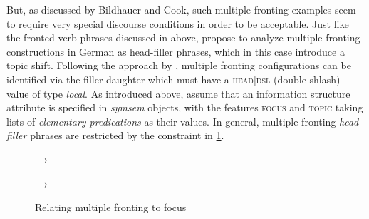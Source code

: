 \documentclass[output=paper]{langsci/langscibook}
\begin{document}
But, as discussed by Bildhauer and Cook, such multiple fronting
examples seem to require very special discourse conditions in order to
be acceptable. Just like the fronted verb phrases discussed in
\cite{dKM2003a} above, \cite{BC2010a} propose
to analyze multiple fronting constructions in German as head-filler
phrases, which in this case introduce a topic shift. Following the
approach by \cite{Mueller2005d-unlinked}, multiple fronting
configurations can be identified via the filler daughter which must
have a \textsc{head|dsl} (double shlash) value of type
\textit{local}. As introduced above, \cite{BC2010a} assume that an
information structure attribute is specified in \textit{symsem}
objects, with the features \textsc{focus} and \textsc{topic} taking
lists of \textit{elementary predications} as their values. In general,
multiple fronting \textit{head-filler} phrases are restricted by the
constraint in \ref{fig:multiplefronting}.
\begin{figure}[htp]
  \centering
    \begin{avm}
    \end{avm}
$\to$\ 
  \begin{avm}
  \end{avm}

\bigskip
    \begin{avm}
    \end{avm}
$\to$\ 
  \begin{avm}
  \end{avm}
  \caption{Relating multiple fronting to focus}
  \label{fig:multiplefronting}
\end{figure}
\end{document}
